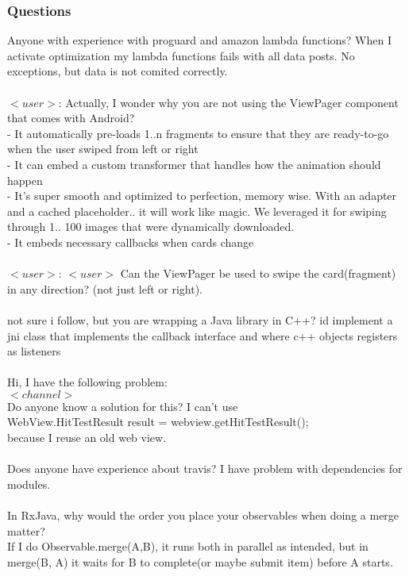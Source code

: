 \documentclass[11pt]{article}
\begin{document}
\subsubsection{Questions}

Anyone with experience with proguard and amazon lambda functions? When I activate optimization my lambda functions fails with all data posts. No exceptions, but data is not comited correctly. \\ ~ \\
$<user>$: Actually, I wonder why you are not using the ViewPager component that comes with Android?\\
- It automatically pre-loads 1..n fragments to ensure that they are ready-to-go when the user swiped from left or right\\
- It can embed a custom transformer that handles how the animation should happen\\
- It's super smooth and optimized to perfection, memory wise. With an adapter and a cached placeholder.. it will work like magic. We leveraged it for swiping through 1.. 100 images that were dynamically downloaded.\\
- It embeds necessary callbacks when cards change \\ ~ \\
$<user>$: $<user>$ Can the ViewPager be used to swipe the card(fragment) in any direction? (not just left or right). \\ ~ \\
not sure i follow, but you are wrapping a Java library in C++? id implement a jni class that implements the callback interface and where c++ objects registers as listeners \\ ~ \\
Hi, I have the following problem:\\
$<channel>$\\
Do anyone know a solution for this? I can't use \\
         WebView.HitTestResult result = webview.getHitTestResult();\\
because I reuse an old web view. \\ ~ \\
Does anyone have experience about travis? I have problem with dependencies for modules. \\ ~ \\
In RxJava, why would the order you place your observables when doing a merge matter? \\
If I do Observable.merge(A,B), it runs both in parallel as intended, but in merge(B, A) it waits for B to complete(or maybe submit item) before A starts.
\fi
\end{document}
